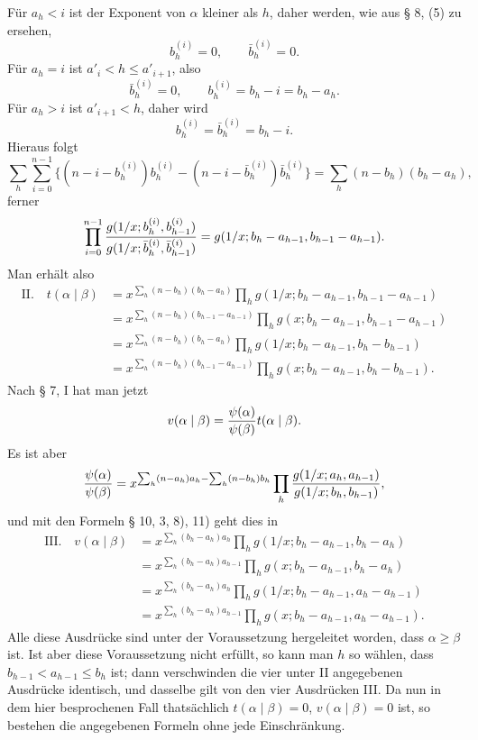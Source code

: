 \documentclass[11pt,a4paper]{article}
\begin{document}
Für $a_h<i$ ist der Exponent von $\alpha$ kleiner als $h$, daher werden, wie aus § 8, (5) zu ersehen,
\[
 b_h^{(i)}=0,
 \qquad \bar b_h^{(i)}=0.
\]
Für $a_h=i$ ist $a'_i<h\le a'_{i+1}$, also
\[
 \bar b_h^{(i)}=0,
 \qquad b_h^{(i)}=b_h-i=b_h-a_h.
\]
Für $a_h>i$ ist $a'_{i+1}<h$, daher wird
\[
 b_h^{(i)}=\bar b_h^{(i)}=b_h-i.
\]
Hieraus folgt
\begin{equation}
 \sum_h\sum_{i=0}^{n-1}\{(n-i-b_h^{(i)})b_h^{(i)}-(n-i-\bar b_h^{(i)})\bar b_h^{(i)}\}
 =\sum_h(n-b_h)(b_h-a_h),
\tag{4}
\end{equation}
ferner
\[
\prod_{i=0}^{n-1}
 {g(1/x;b_h^{(i)},b_{h-1}^{(i)})\over
 g(1/x;\bar b_h^{(i)},\bar b_{h-1}^{(i)})}
 =g(1/x;b_h-a_{h-1},b_{h-1}-a_{h-1}).
\]
Man erhält also
\begin{align*}
\text{II.}\quad
 t(\alpha\mid\beta)
 &=x^{\sum_h(n-b_h)(b_h-a_h)}
 \prod_h g(1/x;b_h-a_{h-1},b_{h-1}-a_{h-1})\\
 &=x^{\sum_h(n-b_h)(b_{h-1}-a_{h-1})}
 \prod_h g(x;b_h-a_{h-1},b_{h-1}-a_{h-1})\\
 &=x^{\sum_h(n-b_h)(b_h-a_h)}
 \prod_h g(1/x;b_h-a_{h-1},b_h-b_{h-1})\\
 &=x^{\sum_h(n-b_h)(b_{h-1}-a_{h-1})}
 \prod_h g(x;b_h-a_{h-1},b_h-b_{h-1}).
\end{align*}
Nach § 7, I hat man jetzt
\[
 v(\alpha\mid\beta)={\psi(\alpha)\over\psi(\beta)}t(\alpha\mid\beta).
\]
Es ist aber
\[
 {\psi(\alpha)\over\psi(\beta)}=
 x^{\sum_h(n-a_h)a_h-\sum_h(n-b_h)b_h}
 \prod_h {g(1/x;a_h,a_{h-1})\over g(1/x;b_h,b_{h-1})},
\]
und mit den Formeln § 10, 3, 8), 11) geht dies in
\begin{align*}
\text{III.}\quad
 v(\alpha\mid\beta)&=x^{\sum_h(b_h-a_h)a_h}
 \prod_h g(1/x;b_h-a_{h-1},b_h-a_h)\\
 &=x^{\sum_h(b_h-a_h)a_{h-1}}
 \prod_h g(x;b_h-a_{h-1},b_h-a_h)\\
 &=x^{\sum_h(b_h-a_h)a_h}
 \prod_h g(1/x;b_h-a_{h-1},a_h-a_{h-1})\\
 &=x^{\sum_h(b_h-a_h)a_{h-1}}
 \prod_h g(x;b_h-a_{h-1},a_h-a_{h-1}).
\end{align*}
Alle diese Ausdrücke sind unter der Voraussetzung hergeleitet worden, dass $\alpha\ge\beta$ ist. Ist aber diese Voraussetzung nicht erfüllt, so kann man $h$ so wählen, dass $b_{h-1}<a_{h-1}\le b_h$ ist; dann verschwinden die vier unter II angegebenen Ausdrücke identisch, und dasselbe gilt von den vier Ausdrücken III. Da nun in dem hier besprochenen Fall thatsächlich $t(\alpha\mid\beta)=0$, $v(\alpha\mid\beta)=0$ ist, so bestehen die angegebenen Formeln ohne jede Einschränkung.
\end{document}
